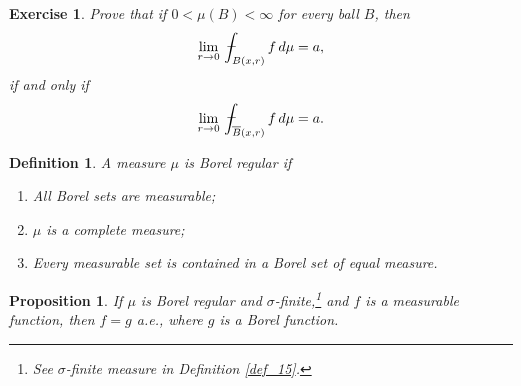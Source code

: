 \documentclass[11pt]{book}
\newtheorem{definition}{Definition}[chapter]
\newtheorem{proposition}{Proposition}[chapter]
\newtheorem{exercise}{Exercise}[section]
\theoremstyle{definition}
\numberwithin{equation}{chapter}
\def\avint{\,\ThisStyle{\ensurestackMath{%
  \stackinset{c}{.2\LMpt}{c}{1\LMpt}{\SavedStyle-}{\SavedStyle\phantom{\int}}}%
  \setbox0=\hbox{$\SavedStyle\int\,$}\kern-\wd0}\int}
\begin{document}
\medskip

\begin{exercise}
Prove that if $0 < \mu(B) < \infty$ for every ball $B$, then
\begin{align*}
    \lim_{r\to 0} \avint_{B(x,r)} f \,d\mu = a,
\end{align*}
if and only if
\begin{align*}
    \lim_{r\to 0} \avint_{\overline{B}(x,r)} f \,d\mu = a.
\end{align*}
\end{exercise}

\medskip

\begin{definition}
A measure $\mu$ is Borel regular if 
\begin{enumerate}[label=(\alph*)]
    \item All Borel sets are measurable;
    
    \item $\mu$ is a complete measure;
    
    \item Every measurable set is contained in a Borel set of equal measure.
\end{enumerate}
\end{definition}

\medskip

\begin{proposition}
If $\mu$ is Borel regular and $\sigma$-finite,\footnote{See $\sigma$-finite measure in Definition \ref{def_15}.} and $f$ is a measurable function, then $f = g$ a.e., where $g$ is a Borel function.
\end{proposition}

\medskip
\end{document}
